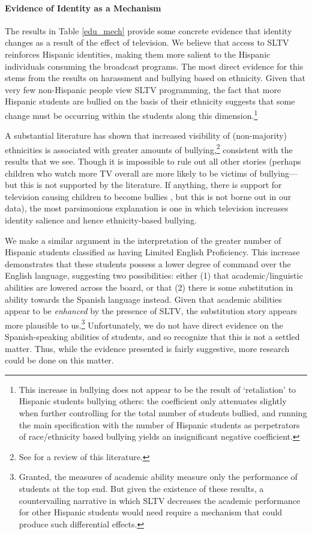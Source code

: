 \documentclass[11pt]{article}
\begin{document}
\paragraph{Evidence of Identity as a Mechanism}
The results in Table \ref{edu_mech} provide some concrete evidence that identity changes as a result of the effect of television. We believe that access to SLTV reinforces Hispanic identities, making them more salient to the Hispanic individuals consuming the broadcast programs. The most direct evidence for this stems from the results on harassment and bullying based on ethnicity. Given that very few non-Hispanic people view SLTV programming, the fact that more Hispanic students are bullied on the basis of their ethnicity suggests that some change must be occurring within the students along this dimension.\footnote{ This increase in bullying does not appear to be the result of `retaliation' to Hispanic students bullying others: the coefficient only attenuates slightly when further controlling for the total number of students bullied, and running the main specification with the number of Hispanic students as perpetrators of race/ethnicity based bullying yields an insignificant negative coefficient. } 

A substantial literature has shown that increased visibility of (non-majority) ethnicities is associated with greater amounts of bullying,\footnote{ See \cite{scherr_bullying_2009} for a review of this literature.} consistent with the results that we see. Though it is impossible to rule out all other stories (perhaps children who watch more TV overall are more likely to be victims of bullying---but this is not supported by the literature. If anything, there is support for television causing children to become bullies \citep{kuntsche_television_2006}, but this is not borne out in our data), the most parsimonious explanation is one in which television increases identity salience and hence ethnicity-based bullying.

We make a similar argument in the interpretation of the greater number of Hispanic students classified as having Limited English Proficiency. This increase demonstrates that these students possess a lower degree of command over the English language, suggesting two possibilities: either (1) that academic/linguistic abilities are lowered across the board, or that (2) there is some substitution in ability towards the Spanish language instead. Given that academic abilities appear to be \textit{enhanced} by the presence of SLTV, the substitution story appears more plausible to us.\footnote{ Granted, the measures of academic ability measure only the performance of students at the top end. But given the existence of these results, a countervailing narrative in which SLTV decreases the academic performance for other Hispanic students would need require a mechanism that could produce such differential effects.} Unfortunately, we do not have direct evidence on the Spanish-speaking abilities of students, and so recognize that this is not a settled matter. Thus, while the evidence presented is fairly suggestive, more research could be done on this matter.
\end{document}
